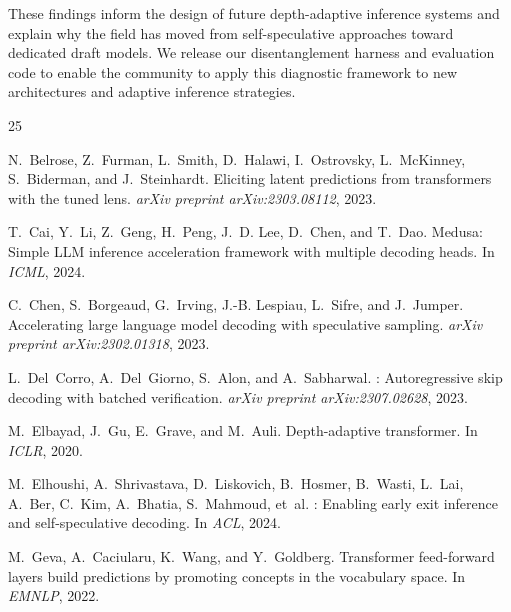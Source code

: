 \documentclass{article}
\begin{document}
These findings inform the design of future depth-adaptive inference systems and explain why the field has moved from self-speculative approaches toward dedicated draft models. We release our disentanglement harness and evaluation code to enable the community to apply this diagnostic framework to new architectures and adaptive inference strategies.



\begin{thebibliography}{25}

N.~Belrose, Z.~Furman, L.~Smith, D.~Halawi, I.~Ostrovsky, L.~McKinney, S.~Biderman, and J.~Steinhardt.
\newblock Eliciting latent predictions from transformers with the tuned lens.
\newblock \emph{arXiv preprint arXiv:2303.08112}, 2023.

T.~Cai, Y.~Li, Z.~Geng, H.~Peng, J.~D. Lee, D.~Chen, and T.~Dao.
\newblock Medusa: Simple {LLM} inference acceleration framework with multiple decoding heads.
\newblock In \emph{ICML}, 2024.

C.~Chen, S.~Borgeaud, G.~Irving, J.-B. Lespiau, L.~Sifre, and J.~Jumper.
\newblock Accelerating large language model decoding with speculative sampling.
\newblock \emph{arXiv preprint arXiv:2302.01318}, 2023.

L.~Del~Corro, A.~Del~Giorno, S.~Alon, and A.~Sabharwal.
: Autoregressive skip decoding with batched verification.
\newblock \emph{arXiv preprint arXiv:2307.02628}, 2023.

M.~Elbayad, J.~Gu, E.~Grave, and M.~Auli.
\newblock Depth-adaptive transformer.
\newblock In \emph{ICLR}, 2020.

M.~Elhoushi, A.~Shrivastava, D.~Liskovich, B.~Hosmer, B.~Wasti, L.~Lai, A.~Ber, C.~Kim, A.~Bhatia, S.~Mahmoud, et~al.
: Enabling early exit inference and self-speculative decoding.
\newblock In \emph{ACL}, 2024.

M.~Geva, A.~Caciularu, K.~Wang, and Y.~Goldberg.
\newblock Transformer feed-forward layers build predictions by promoting concepts in the vocabulary space.
\newblock In \emph{EMNLP}, 2022.


\end{thebibliography}
\end{document}
